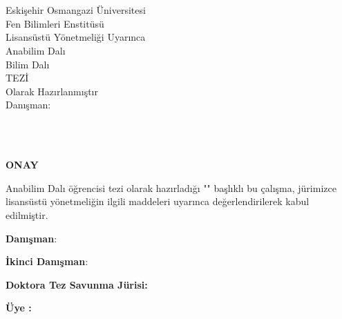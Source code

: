 \documentclass[]{esogu}			%
\begin{document}
\begin{titlingpage*}
\begin{center}
\footnotesize
\begin{vplace}							%
\tbaslik\\								%
\vspace{7pc}							%
\yazar	\\								%
\vspace{7pc}							%
Eskişehir Osmangazi Üniversitesi\\		
Fen Bilimleri Enstitüsü\\
Lisansüstü Yönetmeliği Uyarınca\\
\bolum \space Anabilim Dalı\\
\bilim \space Bilim Dalı\\
\unvan \space TEZİ\\
Olarak Hazırlanmıştır\\
\vspace{7pc}
Danışman:\space \danisman\\			
\vspace{2pc}
\proje\\ 								%
\end{vplace}

\vfill
\teslim\\
\vspace{2cm}
\end{center}

\end{titlingpage*}
\normalsize

\thispagestyle{empty}
\begin{center}
\large
\textbf{ONAY} 
\normalsize
\end{center}
\bolum \space Anabilim Dalı \unvan \space öğrencisi \yazar \space tezi olarak hazırladığı "\textbf{\tbaslik}" başlıklı bu çalışma, jürimizce lisansüstü yönetmeliğin ilgili maddeleri uyarınca değerlendirilerek kabul edilmiştir.

\noindent \textbf{Danışman}\space\space\space\space\space\space\space\space:\space \danisman 

\noindent \textbf{İkinci Danışman}\space:\space \ikidanisman
\newline

\noindent \textbf{Doktora Tez Savunma Jürisi:}

\noindent \textbf{Üye :\space}\jbir
\end{document}
